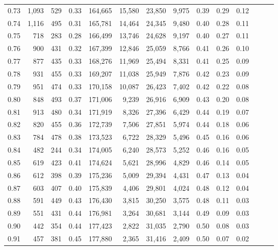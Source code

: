\begin{tabular}{rrrrrrrrrrrrrr}
0.73 &  1,093 &  529 &  0.33 &  164,665 &   15,580 &  23,850 &   9,975 &  0.39 &  0.29 &      0.12 \\
0.74 &  1,116 &  495 &  0.31 &  165,781 &   14,464 &  24,345 &   9,480 &  0.40 &  0.28 &      0.11 \\
0.75 &    718 &  283 &  0.28 &  166,499 &   13,746 &  24,628 &   9,197 &  0.40 &  0.27 &      0.11 \\
0.76 &    900 &  431 &  0.32 &  167,399 &   12,846 &  25,059 &   8,766 &  0.41 &  0.26 &      0.10 \\
0.77 &    877 &  435 &  0.33 &  168,276 &   11,969 &  25,494 &   8,331 &  0.41 &  0.25 &      0.09 \\
0.78 &    931 &  455 &  0.33 &  169,207 &   11,038 &  25,949 &   7,876 &  0.42 &  0.23 &      0.09 \\
0.79 &    951 &  474 &  0.33 &  170,158 &   10,087 &  26,423 &   7,402 &  0.42 &  0.22 &      0.08 \\
0.80 &    848 &  493 &  0.37 &  171,006 &    9,239 &  26,916 &   6,909 &  0.43 &  0.20 &      0.08 \\
0.81 &    913 &  480 &  0.34 &  171,919 &    8,326 &  27,396 &   6,429 &  0.44 &  0.19 &      0.07 \\
0.82 &    820 &  455 &  0.36 &  172,739 &    7,506 &  27,851 &   5,974 &  0.44 &  0.18 &      0.06 \\
0.83 &    784 &  478 &  0.38 &  173,523 &    6,722 &  28,329 &   5,496 &  0.45 &  0.16 &      0.06 \\
0.84 &    482 &  244 &  0.34 &  174,005 &    6,240 &  28,573 &   5,252 &  0.46 &  0.16 &      0.05 \\
0.85 &    619 &  423 &  0.41 &  174,624 &    5,621 &  28,996 &   4,829 &  0.46 &  0.14 &      0.05 \\
0.86 &    612 &  398 &  0.39 &  175,236 &    5,009 &  29,394 &   4,431 &  0.47 &  0.13 &      0.04 \\
0.87 &    603 &  407 &  0.40 &  175,839 &    4,406 &  29,801 &   4,024 &  0.48 &  0.12 &      0.04 \\
0.88 &    591 &  449 &  0.43 &  176,430 &    3,815 &  30,250 &   3,575 &  0.48 &  0.11 &      0.03 \\
0.89 &    551 &  431 &  0.44 &  176,981 &    3,264 &  30,681 &   3,144 &  0.49 &  0.09 &      0.03 \\
0.90 &    442 &  354 &  0.44 &  177,423 &    2,822 &  31,035 &   2,790 &  0.50 &  0.08 &      0.03 \\
0.91 &    457 &  381 &  0.45 &  177,880 &    2,365 &  31,416 &   2,409 &  0.50 &  0.07 &      0.02 \\

\end{tabular}
